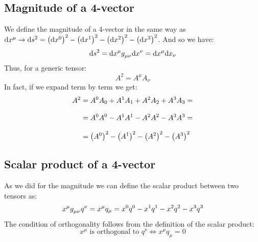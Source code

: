 \subsection{Magnitude of a 4-vector}
We define the magnitude of a 4-vector in the same way as $\mathrm{d}x^{\mu} \rightarrow \mathrm{d}s^2 = \left(\mathrm{d}x^0\right)^2 - \left(\mathrm{d}x^1\right)^2 - \left(\mathrm{d}x^2\right)^2 - \left(\mathrm{d}x^3\right)^2$. And so we have:
\begin{equation}
  \diff{s}^2 = \diff{x}^{\mu} \tensor{g}{_\mu_\nu} \diff{x}^{\nu} = \diff{x}^{\mu} \diff{x}_{\nu}
\end{equation}
Thus, for a generic tensor:
\begin{equation}
  \boxed{A^2 = A^{\mu} A_{\nu}}
\end{equation}
In fact, if we expand term by term we get:
\begin{equation}
  \begin{split}
    A^2 &= A^{0} A_{0} + A^{1} A_{1} + A^{2} A_{2} + A^{3} A_{3} = \\[8pt]
    &= A^{0} A^{0} - A^{1} A^{1} - A^{2} A^{2} - A^{3} A^{3} = \\[8pt]
    &= \left(A^{0}\right)^2 - \left(A^{1}\right)^2 - \left(A^{2}\right)^2 - \left(A^{3}\right)^2
  \end{split}
\end{equation}
\subsection{Scalar product of a 4-vector}
As we did for the magnitude we can define the scalar product between two tensors as:
\begin{equation}
  x^{\mu} \tensor{g}{_\mu_\nu} q^{\nu} = x^{\mu} q_{\mu} = x^{0} q^{0} - x^{1} q^{1} - x^{2} q^{2} -x^{3} q^{3}
\end{equation}
The condition of orthogonality follows from the definition of the scalar product:
\begin{equation}
  x^{\mu} \text{ is orthogonal to } q^{\nu} \iff x^{\mu} q_{\mu} = 0
\end{equation}
